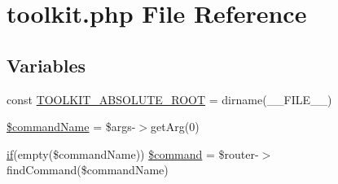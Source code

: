 \hypertarget{toolkit_8php}{\section{toolkit.\-php File Reference}
\label{toolkit_8php}
}
\subsection*{Variables}
\begin{DoxyCompactItemize}
\item 
const \hyperlink{toolkit_8php_a293f551f12530f8d375b3a7018382ae0}{T\-O\-O\-L\-K\-I\-T\-\_\-\-A\-B\-S\-O\-L\-U\-T\-E\-\_\-\-R\-O\-O\-T} = dirname(\-\_\-\-\_\-\-F\-I\-L\-E\-\_\-\-\_\-)
\item 
\hyperlink{toolkit_8php_a60e2f1f45f969130e21d7f44fe93eb0d}{\$command\-Name} = \$args-\/$>$get\-Arg(0)
\item 
\hyperlink{common_8php_ab5cc02e0dea17e26d5401b25d28c71a5}{if}(empty(\$command\-Name)) \hyperlink{toolkit_8php_a53ec4b824571cbb319ce1e7ecc6abec1}{\$command} = \$router-\/$>$find\-Command(\$command\-Name)
\end{DoxyCompactItemize}


